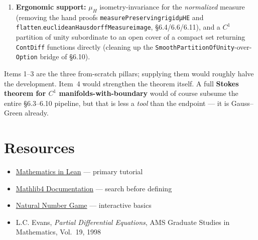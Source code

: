﻿\documentclass[12pt, a4paper]{article}
\renewcommand{\_}{\origunderscore\allowbreak}
\theoremstyle{definition}
\theoremstyle{plain}
\begin{document}
\begin{enumerate}
    \texttt{IsOutwardNormal} could be dropped as a hypothesis and \texttt{divergence\_theorem} would
    take only $(\Omega,F)$ (cf.\ the Scope remark in \S6.0).
  \item \textbf{Ergonomic support:} $\mu_H$ isometry-invariance for the \emph{normalized} measure
    (removing the hand proofs \texttt{measurePreserving\_rigid\_μHE} and
    \texttt{flatten}.\allowbreak\texttt{euclideanHausdorffMeasure\_image}, \S6.4/6.6/6.11), and a
    $C^1$ partition of unity subordinate to an open cover of a compact set returning \texttt{ContDiff}
    functions directly (cleaning up the \texttt{SmoothPartitionOfUnity}-over-\texttt{Option} bridge of
    \S6.10).
\end{enumerate}

Items 1--3 are the three from-scratch pillars; supplying them would roughly halve the development.
Item~4 would strengthen the theorem itself. A full \textbf{Stokes theorem for $C^1$
manifolds-with-boundary} would of course subsume the entire \S6.3--6.10 pipeline, but that is less a
\emph{tool} than the endpoint --- it is Gauss--Green already.

\section{Resources}

\begin{itemize}
  \item \href{https://leanprover-community.github.io/mathematics_in_lean/}
    {Mathematics in Lean} — primary tutorial
  \item \href{https://leanprover-community.github.io/mathlib4_docs/}
    {Mathlib4 Documentation} — search before defining
  \item \href{https://adam.math.hhu.de}{Natural Number Game} — interactive basics
  \item L.C. Evans, \textit{Partial Differential Equations}, AMS Graduate Studies
    in Mathematics, Vol.~19, 1998
\end{itemize}
\end{document}
